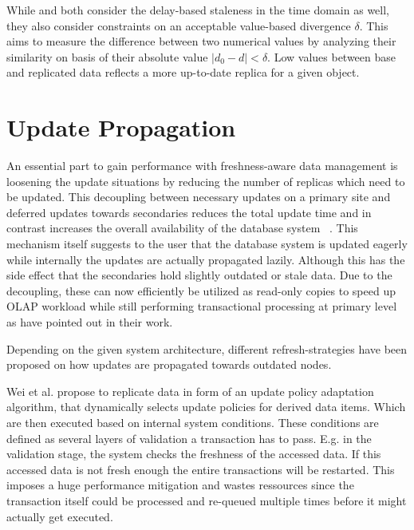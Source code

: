 While \cite{xiang:2008} and \cite{fekete:2018} both consider the delay-based staleness in the time domain as well, they also consider constraints on 
an acceptable value-based divergence $\delta$. This aims to measure the difference between two numerical values by analyzing their similarity on basis of their 
absolute value $|d_0 - d| < \delta $. Low values between base and replicated data reflects a more up-to-date replica for a given object.




\section{Update Propagation}
\label{r:replication}
An essential part to gain performance with freshness-aware data management is loosening the update situations by reducing the number of 
replicas which need to be updated. This decoupling between necessary updates on a primary site and deferred updates towards secondaries 
reduces the total update time and in contrast increases the overall availability of the database system ~\cite{quorums:2003}.
This mechanism itself suggests to the user that the database system is updated eagerly while internally the updates are actually propagated lazily. 
Although this has the side effect that the secondaries hold slightly outdated or stale data.
Due to the decoupling, these can now efficiently be utilized as read-only copies to speed up OLAP workload while still performing transactional processing 
at primary level as \cite{psaroudakis:2015, rohm:2002, xiang:2008} have pointed out in their work.

Depending on the given system architecture, different refresh-strategies have been proposed on how updates are propagated towards outdated nodes.

Wei et al. \cite{wei:2004} propose to replicate data in form of an update policy adaptation algorithm, that dynamically selects update policies
for derived data items. Which are then executed based on internal system conditions. These conditions are defined as several layers of validation a transaction has to pass.
E.g. in the validation stage, the system checks the freshness of the accessed data. If this accessed data is not fresh enough the entire transactions will be restarted.
This imposes a huge performance mitigation and wastes ressources since the transaction itself could be processed and re-queued multiple times before it might actually get executed.\\

